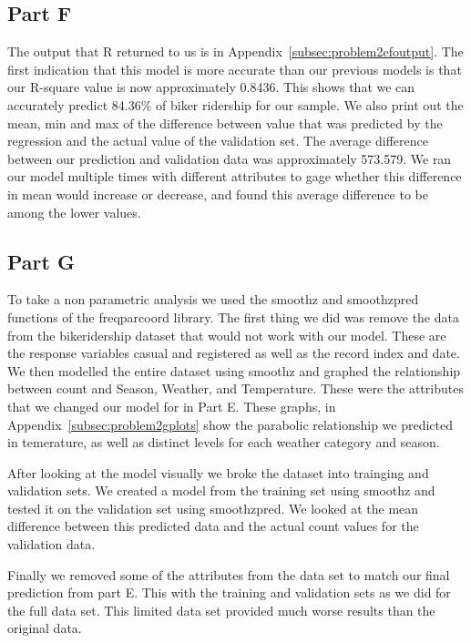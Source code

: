 \documentclass[11pt]{article}
\begin{document}
\subsection{Part F}
\label{subsec:2f}
The output that R returned to us is in Appendix~\ref{subsec:problem2efoutput}. The first indication that this model is more accurate than our previous models is that our R-square value is now approximately 0.8436. This shows that we can accurately predict 84.36\% of biker ridership for our sample. We also print out the mean, min and max of the difference between value that was predicted by the regression and the actual value of the validation set. The average difference between our prediction and validation data was approximately 573.579. We ran our model multiple times with different attributes to gage whether this difference in mean would increase or decrease, and found this average difference to be among the lower values. 
\subsection{Part G}
\label{subsec:2g}
To take a non parametric analysis we used the smoothz and smoothzpred functions of the freqparcoord library. The first thing we did was remove the data from the bikeridership dataset that would not work with our model. These are the response variables casual and registered as well as the record index and date. We then modelled the entire dataset using smoothz and graphed the relationship between count and Season, Weather, and Temperature. These were the attributes that we changed our model for in Part E. These graphs, in Appendix~\ref{subsec:problem2gplots} show the parabolic relationship we predicted in temerature, as well as distinct levels for each weather category and season.

After looking at the model visually we broke the dataset into trainging and validation sets. We created a model from the training set using smoothz and tested it on the validation set using smoothzpred. We looked at the mean difference between this predicted data and the actual count values for the validation data.

Finally we removed some of the attributes from the data set to match our final prediction from part E. This with the training and validation sets as we did for the full data set. This limited data set provided much worse results than the original data.
\end{document}
